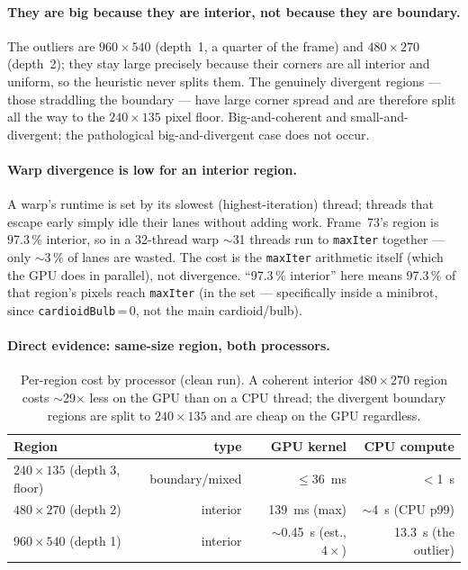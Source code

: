 \documentclass[
	english,
	letterpaper, oneside
]{article}
\begin{document}
\paragraph{They are big because they are interior, not because they are
boundary.} The outliers are $960\times540$ (depth~1, a quarter of the frame) and
$480\times270$ (depth~2); they stay large precisely because their corners are all
interior and uniform, so the heuristic never splits them. The genuinely
divergent regions --- those straddling the boundary --- have large corner
spread and are therefore split all the way to the $240\times135$ pixel floor.
Big-and-coherent and small-and-divergent; the pathological big-and-divergent case
does not occur.

\paragraph{Warp divergence is low for an interior region.} A warp's runtime is
set by its slowest (highest-iteration) thread; threads that escape early simply
idle their lanes without adding work. Frame~73's region is 97.3\,\% interior, so
in a 32-thread warp $\sim$31 threads run to \texttt{maxIter} together --- only
$\sim$3\,\% of lanes are wasted. The cost is the \texttt{maxIter} arithmetic
itself (which the GPU does in parallel), not divergence. ``97.3\,\% interior''
here means 97.3\,\% of that region's pixels reach \texttt{maxIter} (in the set ---
specifically inside a minibrot, since \texttt{cardioidBulb}\,=\,0, not the
main cardioid/bulb).

\paragraph{Direct evidence: same-size region, both processors.}

\begin{table}[H]
    \centering
    \caption{Per-region cost by processor (clean run). A coherent interior
             $480\times270$ region costs $\sim$29$\times$ less on the GPU than on a
             CPU thread; the divergent boundary regions are split to $240\times135$
             and are cheap on the GPU regardless.}
    \label{tab:gpu-outlier}
    \begin{tabular}{lrrr}
        \hline
        Region & type & GPU kernel & CPU compute \\
        \hline
        $240\times135$ (depth 3, floor) & boundary/mixed & $\le$36~ms     & $<$1~s \\
        $480\times270$ (depth 2)        & interior       & 139~ms (max)   & $\sim$4~s (CPU p99) \\
        $960\times540$ (depth 1)        & interior       & $\sim$0.45~s (est., $4\times$) & 13.3~s (the outlier) \\
        \hline
    \end{tabular}
\end{table}
\end{document}
